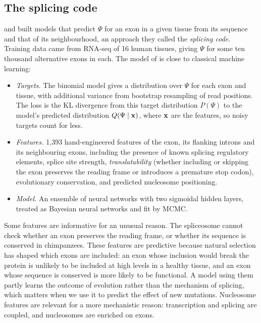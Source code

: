 \subsection{The splicing code}

\citet{barash2010} and \citet{xiong2015} built models that predict $\Psi$ for an exon in a given tissue from its sequence and that of its neighbourhood, an approach they called the \emph{splicing code}. Training data came from RNA-seq of 16 human tissues, giving $\Psi$ for some ten thousand alternative exons in each. The model of \citet{xiong2015} is close to classical machine learning:
\begin{itemize}
  \item \emph{Targets.} The binomial model gives a distribution over $\Psi$ for each exon and tissue, with additional variance from bootstrap resampling of read positions. The loss is the KL divergence from this target distribution $P(\Psi)$ to the model's predicted distribution $Q(\Psi\mid\mathbf{x})$, where $\mathbf{x}$ are the features, so noisy targets count for less.
  \item \emph{Features.} 1,393 hand-engineered features of the exon, its flanking introns and its neighbouring exons, including the presence of known splicing regulatory elements, splice site strength, \emph{translatability} (whether including or skipping the exon preserves the reading frame or introduces a premature stop codon), evolutionary conservation, and predicted nucleosome positioning.
  \item \emph{Model.} An ensemble of neural networks with two sigmoidal hidden layers, treated as Bayesian neural networks and fit by MCMC.
\end{itemize}
Some features are informative for an unusual reason. The spliceosome cannot check whether an exon preserves the reading frame, or whether its sequence is conserved in chimpanzees. These features are predictive because natural selection has shaped which exons are included: an exon whose inclusion would break the protein is unlikely to be included at high levels in a healthy tissue, and an exon whose sequence is conserved is more likely to be functional. A model using them partly learns the outcome of evolution rather than the mechanism of splicing, which matters when we use it to predict the effect of new mutations. Nucleosome features are relevant for a more mechanistic reason: transcription and splicing are coupled, and nucleosomes are enriched on exons.

